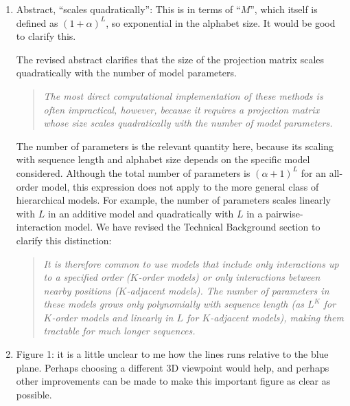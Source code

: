 \documentclass[11pt]{article}
\newenvironment{response}{\par\color{responseblue}}{\par}
\newenvironment{msquote}
  {\begin{quote}\color{responseblue}\itshape\noindent\ignorespaces}
  {\end{quote}}
\begin{document}
\begin{enumerate}

\item Abstract, ``scales quadratically'': This is in terms of ``$M$'', which
itself is defined as $(1+\alpha)^L$, so exponential in the alphabet size. It
would be good to clarify this.

\begin{response}
The revised abstract clarifies that the size of the projection matrix scales quadratically
with the number of model parameters. 
\end{response}

\begin{msquote}
The most direct computational implementation of these methods is often impractical, however, because it requires a projection matrix whose size scales quadratically with the number of model parameters.
\end{msquote}

\begin{response}
The number of parameters is the relevant
quantity here, because its scaling with sequence length and alphabet size depends
on the specific model considered. Although the total number of parameters is
$(\alpha+1)^L$ for an all-order model, this expression does not apply to the more
general class of hierarchical models. For example, the number of parameters
scales linearly with $L$ in an additive model and quadratically with $L$ in a
pairwise-interaction model. We have revised the Technical Background section to
clarify this distinction:
\end{response}

\begin{msquote}
It is therefore common to use models that include only interactions up to a
specified order ($K$-order models) or only interactions between nearby positions
($K$-adjacent models). The number of parameters in these models grows only
polynomially with sequence length (as $L^K$ for $K$-order models and linearly in
$L$ for $K$-adjacent models), making them tractable for much longer sequences.
\end{msquote}

\item Figure 1: it is a little unclear to me how the lines runs relative to the
blue plane. Perhaps choosing a different 3D viewpoint would help, and perhaps
other improvements can be made to make this important figure as clear as
possible.


\end{enumerate}
\end{document}
